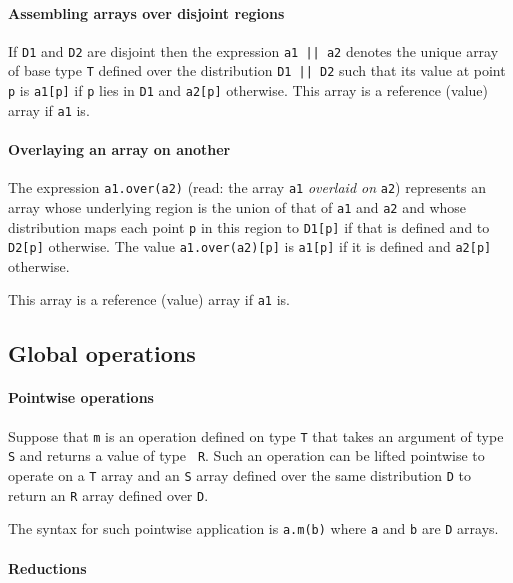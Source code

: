 \paragraph{Assembling arrays over disjoint regions}

If {\tt D1} and {\tt D2} are disjoint then the expression {\tt a1 ||
a2} denotes the unique array of base type {\tt T} defined over the
distribution {\tt D1 || D2} such that its value at point {\tt p} is
{\tt a1[p]} if {\tt p} lies in {\tt D1} and {\tt a2[p]}
otherwise. This array is a reference (value) array if {\tt a1} is.

\paragraph{Overlaying an array on another}
The expression
{\tt a1.over(a2)} (read: the array {\tt a1} {\em overlaid on} {\tt a2})
represents an array whose underlying region is the union of that of
{\tt a1} and {\tt a2} and whose distribution maps each point {\tt p}
in this region to {\tt D1[p]} if that is defined and to {\tt D2[p]}
otherwise. The value {\tt a1.over(a2)[p]} is {\tt a1[p]} if it is defined and {\tt a2[p]} otherwise.

This array is a reference (value) array if {\tt a1} is.




\subsection{Global operations }
\paragraph{Pointwise operations}\label{ArrayPointwise}
Suppose that {\tt m} is an operation defined on type {\tt T} that
takes an argument of type {\tt S} and returns a value of type {\tt
R}. Such an operation can be lifted pointwise to operate on a {\tt T}
array and an {\tt S} array defined over the same distribution {\tt D}
to return an {\tt R} array defined over {\tt D}.

The syntax for such pointwise application is {\tt a.m(b)} where {\tt a} and
{\tt b} are {\tt D} arrays.

\paragraph{Reductions}\label{ArrayReductions}

